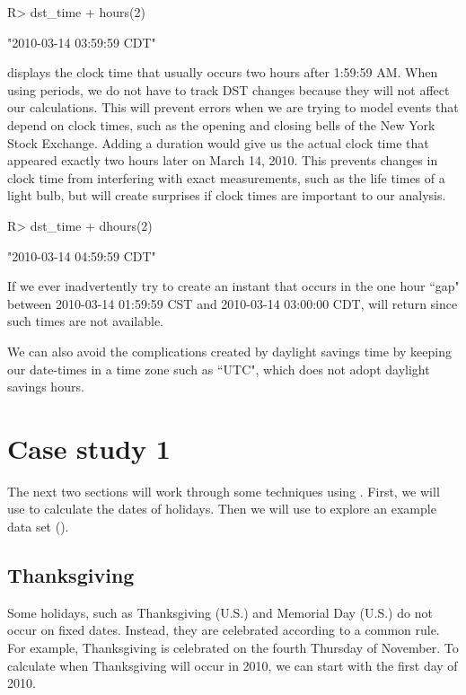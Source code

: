 \documentclass[article]{jss}
\begin{document}
\begin{CodeInput}
R> dst_time + hours(2)
\end{CodeInput}
\begin{CodeOutput}
[1] "2010-03-14 03:59:59 CDT"
\end{CodeOutput}

displays the clock time that usually occurs two hours after 1:59:59 AM. When using periods, we do not have to track DST changes because they will not affect our calculations. This will prevent errors when we are trying to model events that depend on clock times, such as the opening and closing bells of the New York Stock Exchange. 
Adding a duration would give us the actual clock time that appeared exactly two hours later on March 14, 2010. This prevents changes in clock time from interfering with exact measurements, such as the life times of a light bulb, but will create surprises if clock times are important to our analysis. 

\begin{CodeInput}
R> dst_time + dhours(2)
\end{CodeInput}
\begin{CodeOutput}
[1] "2010-03-14 04:59:59 CDT"
\end{CodeOutput}

If we ever inadvertently try to create an instant that occurs in the one hour ``gap" between 2010-03-14 01:59:59 CST  and 2010-03-14 03:00:00 CDT,  will return  since such times are not available.

We can also avoid the complications created by daylight savings time by keeping our date-times in a time zone such as ``UTC", which does not adopt daylight savings hours.

\section{Case study 1}

The next two sections will work through some techniques using . First, we will use  to calculate the dates of  holidays. Then we will use  to explore an example data set ().

\subsection{Thanksgiving}
Some holidays, such as Thanksgiving (U.S.) and Memorial Day (U.S.) do not occur on fixed dates. Instead, they are celebrated according to a common rule. For example, Thanksgiving is celebrated on the fourth Thursday of November. To calculate when Thanksgiving will occur in 2010, we can start with the first day of 2010.
\end{document}
